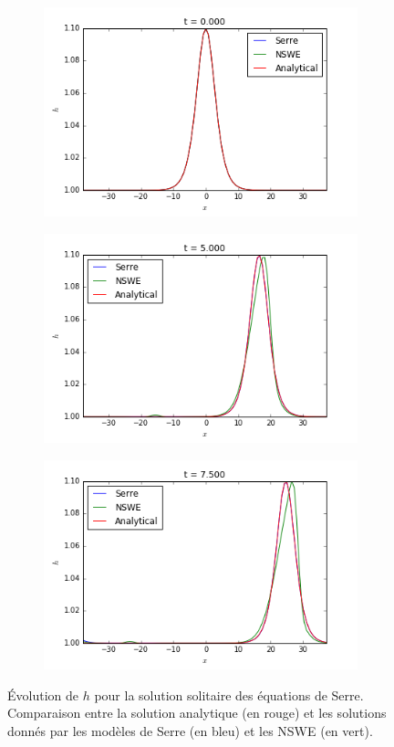 \begin{figure}[h!]
	\begin{subfigure}{.3\linewidth}
		\includegraphics[scale=.3]{figures/Serre/4x4solitary1h.png}	
	\end{subfigure}
	\begin{subfigure}{.3\linewidth}
		\includegraphics[scale=.3]{figures/Serre/4x4solitary2h.png}	
	\end{subfigure}
	\begin{subfigure}{.3\linewidth}
		\includegraphics[scale=.3]{figures/Serre/4x4solitary3h.png}	
	\end{subfigure}
	\caption{Évolution de $h$ pour la solution solitaire des équations de Serre. Comparaison entre la solution analytique (en rouge) et les solutions donnés par les modèles de Serre (en bleu) et les NSWE (en vert). \label{fig:solitaryh}}
\end{figure}

